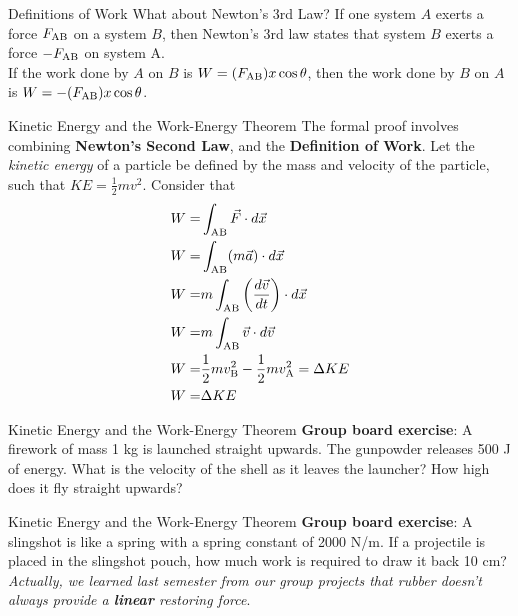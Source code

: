 \documentclass{beamer}
\begin{document}
\begin{frame}{Definitions of Work}
What about Newton's 3rd Law?  If one system $A$ exerts a force $F_{\rm AB}$ on a system $B$, then Newton's 3rd law states that system $B$ exerts a force $-F_{\rm AB}$ on system A. \\
\vspace{0.5cm}
If \alert{the work done by $A$ on $B$} is $W = (F_{\rm AB})x\cos\theta$, then \alert{the work done by $B$ on $A$} is $W = -(F_{\rm AB})x\cos\theta$.
\end{frame}

\begin{frame}{Kinetic Energy and the Work-Energy Theorem}
\small
The formal proof involves combining \textbf{Newton's Second Law}, and the \textbf{Definition of Work}.  Let the \textit{kinetic energy} of a particle be defined by the mass and velocity of the particle, such that $KE = \frac{1}{2}mv^2$.  Consider that
\begin{align}
W =& \int_{\rm AB} \vec{F} \cdot d\vec{x} \\
W =& \int_{\rm AB} (m\vec{a}) \cdot d\vec{x} \\
W =& m\int_{\rm AB} \left( \frac{d\vec{v}}{dt} \right) \cdot d\vec{x} \\
W =& m\int_{\rm AB} \vec{v} \cdot d\vec{v} \\
W =& \frac{1}{2}m v_{\rm B}^2 - \frac{1}{2}m v_{\rm A}^2 = \Delta KE \\
W =& \Delta KE
\end{align}
\end{frame}

\begin{frame}{Kinetic Energy and the Work-Energy Theorem}
\textbf{Group board exercise}: A firework of mass 1 kg is launched straight upwards.  The gunpowder releases 500 J of energy.  What is the velocity of the shell as it leaves the launcher?  How high does it fly straight upwards?
\end{frame}

\begin{frame}{Kinetic Energy and the Work-Energy Theorem}
\textbf{Group board exercise}: A slingshot is like a spring with a spring constant of 2000 N/m.  If a projectile is placed in the slingshot pouch, how much work is required to draw it back 10 cm? \\ \vspace{0.5cm}
\small
\textit{Actually, we learned last semester from our group projects that rubber doesn't always provide a \textbf{linear} restoring force}.
\end{frame}
\end{document}
